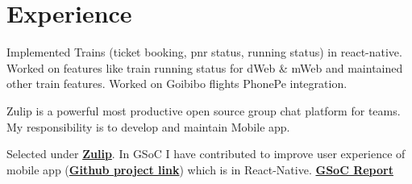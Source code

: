 \documentclass[a4paper]{deedy-resume} %
\begin{document}
    \begin{minipage}[t]{0.66\textwidth} %
    
    
    \section{Experience}
    
    Implemented Trains (ticket booking, pnr status, running status) in react-native. Worked on features like train running status for dWeb \& mWeb and maintained other train features. Worked on Goibibo flights PhonePe integration.
    
    \sectionspace %
    
    
    Zulip is a powerful most productive open source group chat platform for teams. My responsibility is to develop and maintain Mobile app.
    
    
    \sectionspace %
    
    
    \descript{}
    
    Selected under \href{https://zulipchat.com}{\bf Zulip}. In GSoC I have contributed to improve user experience of mobile app (\href{https://github.com/zulip/zulip-mobile}{\bf Github project link}) which is in React-Native.
    \href{https://jainkuniya.github.io/gsoc-work-report/}{\bf GSoC Report}
    
    \sectionspace %
    

\end{minipage}
\end{document}
